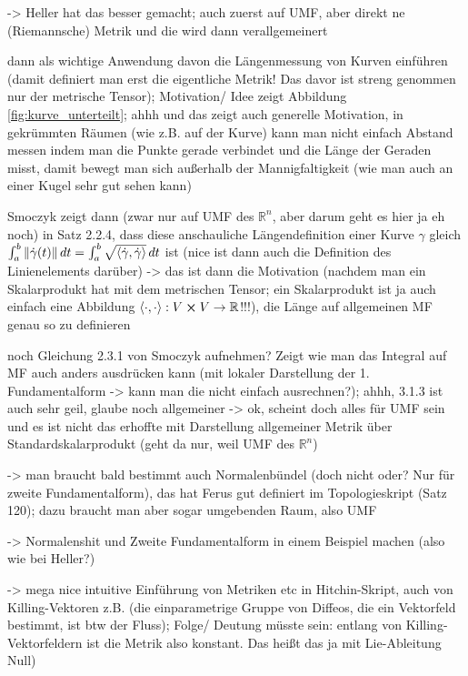 \documentclass[../H_Analysis_main.tex]{subfiles}
\begin{document}
-> Heller hat das besser gemacht; auch zuerst auf UMF, aber direkt ne (Riemannsche) Metrik und die wird dann verallgemeinert


dann als wichtige Anwendung davon die Längenmessung von Kurven einführen (damit definiert man erst die eigentliche Metrik! Das davor ist streng genommen nur der metrische Tensor); Motivation/ Idee zeigt Abbildung \ref{fig:kurve_unterteilt}; ahhh und das zeigt auch generelle Motivation, in gekrümmten Räumen (wie z.B. auf der Kurve) kann man nicht einfach Abstand messen indem man die Punkte gerade verbindet und die Länge der Geraden misst, damit bewegt man sich außerhalb der Mannigfaltigkeit (wie man auch an einer Kugel sehr gut sehen kann)



Smoczyk zeigt dann (zwar nur auf UMF des $\mathbb{R}^n$, aber darum geht es hier ja eh noch) in Satz 2.2.4, dass diese anschauliche Längendefinition einer Kurve $\gamma$ gleich $\int_a^b \norm{\dot{\gamma}(t)} \, dt = \int_a^b \sqrt{\langle \dot{\gamma}, \dot{\gamma} \rangle} \, dt$ ist (nice ist dann auch die Definition des Linienelements darüber) -> das ist dann die Motivation (nachdem man ein Skalarprodukt hat mit dem metrischen Tensor; ein Skalarprodukt ist ja auch einfach eine Abbildung $\langle \cdot, \cdot \rangle: V \cross V \rightarrow \mathbb{R}$!!!), die Länge auf allgemeinen MF genau so zu definieren



noch Gleichung 2.3.1 von Smoczyk aufnehmen? Zeigt wie man das Integral auf MF auch anders ausdrücken kann (mit lokaler Darstellung der 1. Fundamentalform -> kann man die nicht einfach ausrechnen?); ahhh, 3.1.3 ist auch sehr geil, glaube noch allgemeiner -> ok, scheint doch alles für UMF sein und es ist nicht das erhoffte mit Darstellung allgemeiner Metrik über Standardskalarprodukt (geht da nur, weil UMF des $\mathbb{R}^n$)



-> man braucht bald bestimmt auch Normalenbündel (doch nicht oder? Nur für zweite Fundamentalform), das hat Ferus gut definiert im Topologieskript (Satz 120); dazu braucht man aber sogar umgebenden Raum, also UMF

-> Normalenshit und Zweite Fundamentalform in einem Beispiel machen (also wie bei Heller?)


-> mega nice intuitive Einführung von Metriken etc in Hitchin-Skript, auch von Killing-Vektoren z.B. (die einparametrige Gruppe von Diffeos, die ein Vektorfeld bestimmt, ist btw der Fluss); Folge/ Deutung müsste sein: entlang von Killing-Vektorfeldern ist die Metrik also konstant. Das heißt das ja mit Lie-Ableitung Null)
\end{document}
